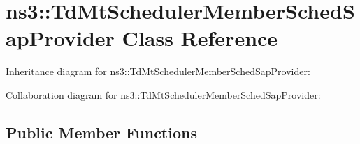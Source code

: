 \hypertarget{classns3_1_1TdMtSchedulerMemberSchedSapProvider}{}\section{ns3\+:\+:Td\+Mt\+Scheduler\+Member\+Sched\+Sap\+Provider Class Reference}
\label{classns3_1_1TdMtSchedulerMemberSchedSapProvider}


Inheritance diagram for ns3\+:\+:Td\+Mt\+Scheduler\+Member\+Sched\+Sap\+Provider\+:


Collaboration diagram for ns3\+:\+:Td\+Mt\+Scheduler\+Member\+Sched\+Sap\+Provider\+:
\subsection*{Public Member Functions}
